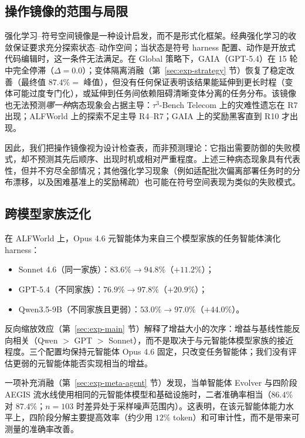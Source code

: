 \subsection{操作镜像的范围与局限}

强化学习--符号空间镜像是一种设计启发，而不是形式化框架。经典强化学习的收敛保证要求充分探索状态--动作空间；当状态是符号 harness 配置、动作是开放式代码编辑时，这一条件无法满足。在 Global 策略下，GAIA（GPT-5.4）在 15 轮中完全停滞（$\Delta{=}0.0$）；变体隔离消融（第~\ref{sec:exp-strategy} 节）恢复了稳定改善（最终值 $87.4\%=$ 峰值），但没有任何保证表明该结果能延伸到更长时程（变体可能过度专门化），或延伸到任务间依赖阻碍清晰变体分离的任务分布。该镜像也无法预测\textit{哪一种}病态现象会占据主导：$\tau^3$-Bench Telecom 上的灾难性遗忘在 R7 出现；ALFWorld 上的探索不足主导 R4--R7；GAIA 上的奖励黑客直到 R10 才出现。

因此，我们把操作镜像视为设计检查表，而非预测理论：它指出需要防御的失败模式，却不预测其先后顺序、出现时机或相对严重程度。上述三种病态现象具有代表性，但并不穷尽全部情况；其他强化学习现象（例如适配批次偏离部署任务时的分布漂移，以及困难基准上的奖励稀疏）也可能在符号空间表现为类似的失败模式。

\subsection{跨模型家族泛化}

在 ALFWorld 上，Opus 4.6 元智能体为来自三个模型家族的任务智能体演化 harness：
\begin{itemize}
  \item Sonnet 4.6（同一家族）：$83.6\%\to94.8\%$（$+11.2\%$）；
  \item GPT-5.4（不同家族）：$76.9\%\to97.8\%$（$+20.9\%$）；
  \item Qwen3.5-9B（不同家族且更弱）：$53.0\%\to97.0\%$（$+44.0\%$）。
\end{itemize}
反向缩放效应（第~\ref{sec:exp-main} 节）解释了增益大小的次序：增益与基线性能反向相关（Qwen $>$ GPT $>$ Sonnet），而不是取决于与元智能体模型家族的接近程度。三个配置均保持元智能体 Opus 4.6 固定，只改变任务智能体；我们没有评估更弱的元智能体能否实现相当的增益。

一项补充消融（第~\ref{sec:exp-meta-agent} 节）发现，当单智能体 Evolver 与四阶段 AEGIS 流水线使用相同的元智能体模型和基础设施时，二者准确率相当（$86.4\%$ 对 $87.4\%$；$n{=}103$ 时差异处于采样噪声范围内）。这表明，在该元智能体能力水平上，四阶段分解主要提高效率（约少用 $12\%$ token）和可审计性，而不是带来可测量的准确率改善。

